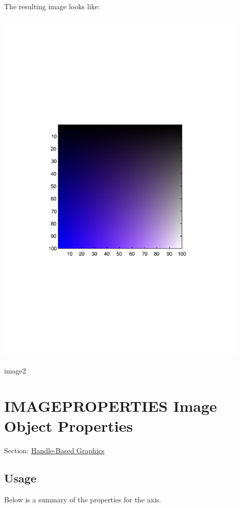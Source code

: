 The resulting image looks like\-:  
\begin{DoxyImage}
\includegraphics[width=12cm]{image2}
\caption{image2}
\end{DoxyImage}
 \hypertarget{handle_imageproperties}{}\section{I\-M\-A\-G\-E\-P\-R\-O\-P\-E\-R\-T\-I\-E\-S Image Object Properties}\label{handle_imageproperties}
Section\-: \hyperlink{sec_handle}{Handle-\/\-Based Graphics} \hypertarget{vtkwidgets_vtkxyplotwidget_Usage}{}\subsection{Usage}\label{vtkwidgets_vtkxyplotwidget_Usage}
Below is a summary of the properties for the axis. 
